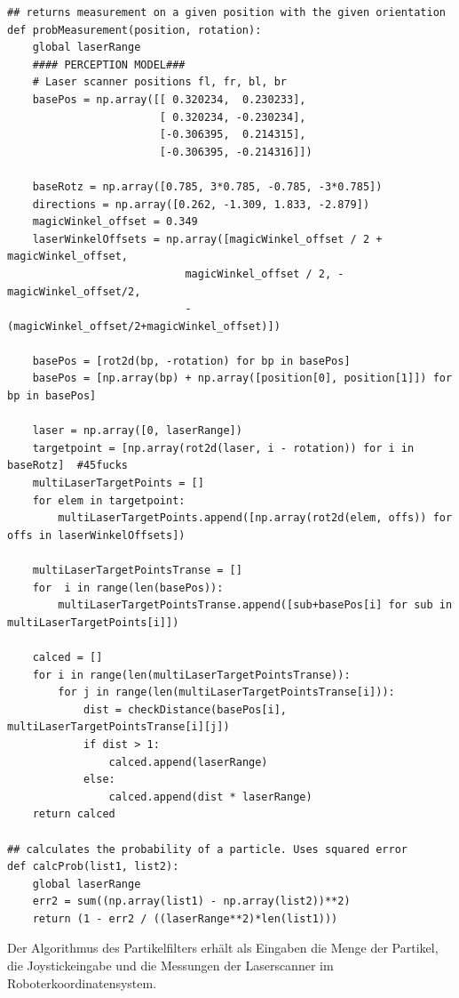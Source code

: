 \documentclass{../Vorlage/mat}
\begin{document}
\begin{lstlisting}
## returns measurement on a given position with the given orientation
def probMeasurement(position, rotation):
    global laserRange
    #### PERCEPTION MODEL###
    # Laser scanner positions fl, fr, bl, br
    basePos = np.array([[ 0.320234,  0.230233],
                        [ 0.320234, -0.230234],
                        [-0.306395,  0.214315],
                        [-0.306395, -0.214316]])

    baseRotz = np.array([0.785, 3*0.785, -0.785, -3*0.785])
    directions = np.array([0.262, -1.309, 1.833, -2.879])
    magicWinkel_offset = 0.349
    laserWinkelOffsets = np.array([magicWinkel_offset / 2 + magicWinkel_offset,
                            magicWinkel_offset / 2, -magicWinkel_offset/2,
                            -(magicWinkel_offset/2+magicWinkel_offset)])

    basePos = [rot2d(bp, -rotation) for bp in basePos]
    basePos = [np.array(bp) + np.array([position[0], position[1]]) for bp in basePos]

    laser = np.array([0, laserRange])
    targetpoint = [np.array(rot2d(laser, i - rotation)) for i in baseRotz]  #45fucks
    multiLaserTargetPoints = []
    for elem in targetpoint:
        multiLaserTargetPoints.append([np.array(rot2d(elem, offs)) for offs in laserWinkelOffsets])

    multiLaserTargetPointsTranse = []
    for  i in range(len(basePos)):
        multiLaserTargetPointsTranse.append([sub+basePos[i] for sub in multiLaserTargetPoints[i]])

    calced = []
    for i in range(len(multiLaserTargetPointsTranse)):
        for j in range(len(multiLaserTargetPointsTranse[i])):
            dist = checkDistance(basePos[i], multiLaserTargetPointsTranse[i][j])
            if dist > 1:
                calced.append(laserRange)
            else:
                calced.append(dist * laserRange)
    return calced

## calculates the probability of a particle. Uses squared error
def calcProb(list1, list2):
    global laserRange
    err2 = sum((np.array(list1) - np.array(list2))**2)
    return (1 - err2 / ((laserRange**2)*len(list1)))
\end{lstlisting}

Der Algorithmus des Partikelfilters erhält als Eingaben die Menge der Partikel, die Joystickeingabe und die Messungen der Laserscanner im Roboterkoordinatensystem.
\end{document}
